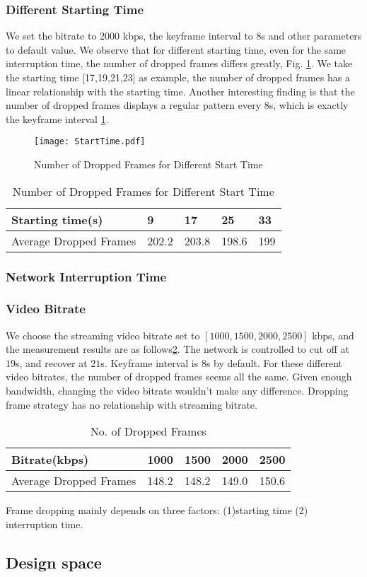 \subsubsection{Different Starting Time}
We set the bitrate to $2000$ kbps, the keyframe interval to $8$s and other parameters to default value. We observe that for different starting time, even for the same interruption time, the number of dropped frames differs greatly, Fig. \ref{fig_starttime}. We take the starting time [17,19,21,23] as example, the number of dropped frames has a linear relationship with the starting time. Another interesting finding is that the number of dropped frames displays a regular pattern every $8$s, which is exactly the keyframe interval \ref{tab_startregular}.
\begin{figure}[t]
\centering
\texttt{[image: StartTime.pdf]}
\vspace{-0.08in}
\caption{Number of Dropped Frames for Different Start Time}
\vspace{-0.1in}
\label{fig_starttime}
\end{figure}

\begin{table}[!htb]
\centering
\caption{Number of Dropped Frames for Different Start Time}
\label{tab_startregular}
\begin{tabular}{|l|l|l|l|l|}
\hline
Starting time(s)       & 9     & 17    & 25    & 33  \\ \hline
Average Dropped Frames & 202.2 & 203.8 & 198.6 & 199 \\ \hline
\end{tabular}
\end{table}


\subsubsection{Network Interruption Time}


\subsubsection{Video Bitrate}
We choose the streaming video bitrate set to $[1000,1500,2000,2500]$ kbps, and the measurement results are as follows\ref{tab_Bitrate}.
The network is controlled to cut off at $19$s, and recover at $21$s. Keyframe interval is $8$s by default.
For these different video bitrates, the number of dropped frames seems all the same. Given enough bandwidth, changing the video bitrate wouldn't make any difference. Dropping frame strategy has no relationship with streaming bitrate.
\begin{table}[!htb]
\centering
\caption{No. of Dropped Frames}
\label{tab_Bitrate}
\begin{tabular}{|l|l|l|l|l|}
\hline
Bitrate(kbps)          & 1000  & 1500  & 2000  & 2500  \\ \hline
Average Dropped Frames & 148.2 & 148.2 & 149.0 & 150.6 \\ \hline
\end{tabular}
\end{table}

Frame dropping mainly depends on three factors: (1)starting time (2) interruption time.

\subsection{Design space}

\fi
